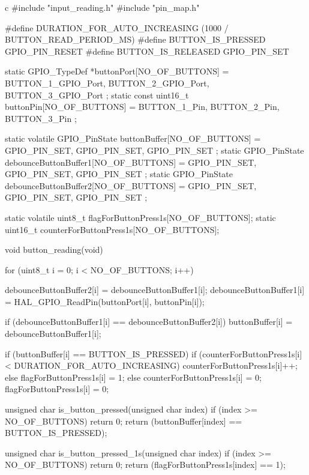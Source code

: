 \documentclass{hcmut-report}
\begin{document}
\begin{code}{c}
#include "input_reading.h"
#include "pin_map.h"

#define DURATION_FOR_AUTO_INCREASING  (1000 / BUTTON_READ_PERIOD_MS)
#define BUTTON_IS_PRESSED   GPIO_PIN_RESET
#define BUTTON_IS_RELEASED  GPIO_PIN_SET

static GPIO_TypeDef *buttonPort[NO_OF_BUTTONS] =
    { BUTTON_1_GPIO_Port, BUTTON_2_GPIO_Port, BUTTON_3_GPIO_Port };
static const uint16_t buttonPin[NO_OF_BUTTONS] =
    { BUTTON_1_Pin, BUTTON_2_Pin, BUTTON_3_Pin };

static volatile GPIO_PinState buttonBuffer[NO_OF_BUTTONS] =
    { GPIO_PIN_SET, GPIO_PIN_SET, GPIO_PIN_SET };
static GPIO_PinState debounceButtonBuffer1[NO_OF_BUTTONS] =
    { GPIO_PIN_SET, GPIO_PIN_SET, GPIO_PIN_SET };
static GPIO_PinState debounceButtonBuffer2[NO_OF_BUTTONS] =
    { GPIO_PIN_SET, GPIO_PIN_SET, GPIO_PIN_SET };

static volatile uint8_t flagForButtonPress1s[NO_OF_BUTTONS];
static uint16_t counterForButtonPress1s[NO_OF_BUTTONS];

void button_reading(void)
{
  for (uint8_t i = 0; i < NO_OF_BUTTONS; i++) {
    debounceButtonBuffer2[i] = debounceButtonBuffer1[i];
    debounceButtonBuffer1[i] = HAL_GPIO_ReadPin(buttonPort[i], buttonPin[i]);

    if (debounceButtonBuffer1[i] == debounceButtonBuffer2[i])
      buttonBuffer[i] = debounceButtonBuffer1[i];

    if (buttonBuffer[i] == BUTTON_IS_PRESSED) {
      if (counterForButtonPress1s[i] < DURATION_FOR_AUTO_INCREASING)
        counterForButtonPress1s[i]++;
      else
        flagForButtonPress1s[i] = 1;
    } else {
      counterForButtonPress1s[i] = 0;
      flagForButtonPress1s[i] = 0;
    }
  }
}

unsigned char is_button_pressed(unsigned char index) {
  if (index >= NO_OF_BUTTONS) return 0;
  return (buttonBuffer[index] == BUTTON_IS_PRESSED);
}

unsigned char is_button_pressed_1s(unsigned char index) {
  if (index >= NO_OF_BUTTONS) return 0;
  return (flagForButtonPress1s[index] == 1);
}
\end{code}
\end{document}

